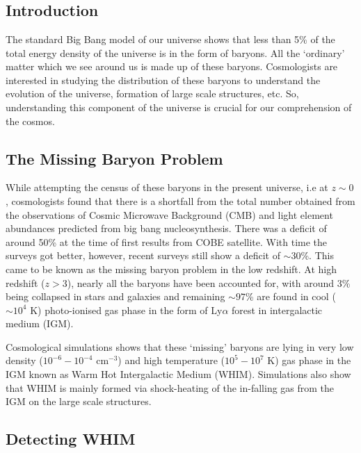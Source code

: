 \documentclass[12pt,oneside,noprintercorrection]{iut}
\begin{document}
\chapter*{}

\vspace*{-4cm}

\section*{Introduction}

The standard Big Bang model of our universe shows that less than 5\% of the total energy density of the universe is in the form of baryons. All the `ordinary' matter which we see around us is made up of these baryons. Cosmologists are interested in studying the distribution of these baryons to understand the evolution of the universe, formation of large scale structures, etc. So, understanding this component of the universe is crucial for our comprehension of the cosmos.

\section*{The Missing Baryon Problem}

While attempting the census of these baryons in the present universe, i.e at $z \sim 0$, cosmologists found that there is a shortfall from the total number obtained from the observations of Cosmic Microwave Background (CMB) and light element abundances predicted from big bang nucleosynthesis. There was a deficit of around 50\% at the time of first results from COBE satellite. With time the surveys got better, however, recent surveys still show a deficit of $\sim 30$\%. This came to be known as the missing baryon problem in the low redshift. At high redshift ($z>3$), nearly all the baryons have been accounted for, with around 3\% being collapsed in stars and galaxies and remaining $\sim97$\% are found in cool ($\sim10^4$ K) photo-ionised gas phase in the form of Ly$\alpha$ forest in intergalactic medium (IGM). 

Cosmological simulations shows that these `missing' baryons are lying in very low density ($10^{-6}-10^{-4}$ cm$^{-3}$) and high temperature ($10^5-10^7$ K) gas phase in the IGM known as Warm Hot Intergalactic Medium (WHIM). Simulations also show that WHIM is mainly formed via shock-heating of the in-falling gas from the IGM on the large scale structures.

\section*{Detecting WHIM}
\end{document}
